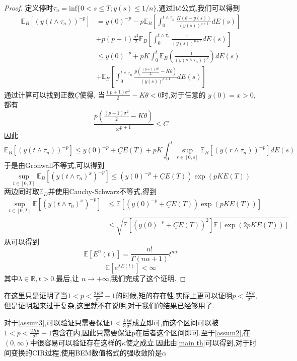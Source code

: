 \begin{proof}
	定义停时$\tau_{n}=\mathrm{inf}\{0<s\leq T;y(s)\leq1/n\}$,通过It\^{o}公式,我们可以得到
	$$\begin{aligned}
		\mathbb{E}_B\left[(y(t\wedge\tau_{n}))^{-p}\right] &=y(0)^{-p}-p\mathbb{E}_B\left[\int_{0}^{t\wedge\tau_{n}}\frac{K(\theta-y(s))}{(y(s))^{p+1}}dE(s)\right]\\
		&+p(p+1)\frac{\sigma^{2}}{2}\mathbb{E}_B\left[\int_{0}^{t\wedge\tau_{n}}\frac{1}{(y(s))^{p+1}}dE(s)\right] \\
		&\leq y(0)^{-p}+pK\int_{0}^{t}\mathbb{E}_B\left(\frac{1}{(y(s\wedge\tau_{n}))^{p}}
		\right)dE(s) \\
		&+\mathbb{E}_B\left[\int_0^{t\wedge\tau_n}\frac{p\left(\frac{(p+1)\sigma^2}{2}-K\theta\right)}{(y(s))^{p+1}}dE(s)\right]
	\end{aligned}$$
	通过计算可以找到正数$\underline C$使得, 当$\frac{(p+1)\sigma^2}{2}-K\theta<0$时,对于任意的 $y(0)=x>0$,都有
	$$\frac{p\left(\frac{(p+1)\sigma^2}{2}-K\theta\right)}{x^{p+1}}\leq \underline C$$
	因此
	$$\mathbb{E}_B\left[(y(t\wedge\tau_n))^{-p}\right]\leq y(0)^{-p}+\underline{C}E(T)+pK\int_0^t\sup_{r\in[0,s]}\mathbb{E}_B\left[(y(r\wedge\tau_n))^{-p}\right]dE(s)$$
	于是由Gronwall不等式,可以得到
	$$\sup\limits_{t\in[0,T]}\mathbb{E}_B\left[(y(t\wedge\tau_n)^x)^{-p}\right]\leq\left(y(0)^{-p}+\underline{C}E(T)\right)\exp(pKE(T))$$
	两边同时取$\mathbb{E}_D$并使用Cauchy-Schwarz不等式,得到
	$$\begin{aligned}
		\sup\limits_{t\in[0,T]}\mathbb{E}\left[(y(t\wedge\tau_n)^x)^{-p}\right]&\leq\mathbb{E}\left[\left(y(0)^{-p}+\underline{C}E(T)\right)\exp(pKE(T))\right]\\
		&\leq\sqrt{\mathbb{E}\left[\left(y(0)^{-p}+\underline{C}E(T)\right)^2\right]\mathbb{E}\left[\exp(2pKE(T))\right]}
	\end{aligned}$$
	从\cite{jum2014strong}可以得到
	\begin{equation}
		\mathbb{E}[E^n(t)]=\frac{n!}{\Gamma(n\alpha+1)}t^{n\alpha}
	\end{equation}
	\begin{equation}
		\mathbb{E}[e^{\lambda E(t)}]<\infty
	\end{equation}
	其中$\lambda \in \mathbb{R},t>0$.最后,让 $n\to+\infty$,我们完成了这个证明.
\end{proof}
\begin{remark}
	在这里只是证明了当$1<p<\frac{2K\theta}{\sigma^2}-1$的时候,矩的存在性,实际上更可以证明$p<\frac{2K\theta}{\sigma^2}$,但是证明起来过于复杂,这里就不在说明,对于我们的结果已经够用了.
\end{remark}
对于\cref{assum3},可以验证只需要保证$1 < \frac{4}{3}\frac{k\theta}{\sigma^2}$成立即可,而这个区间可以被$1<p<\frac{2K\theta}{\sigma^2}-1$包含在内,因此只需要保证p在后者这个区间即可.至于\cref{assum2},在$(0,\infty)$中很容易可以验证存在这样的$\kappa$使之成立.因此由\cref{main th}可以得到,对于时间变换的CIR过程,使用BEM数值格式的强收敛阶是$\alpha$
